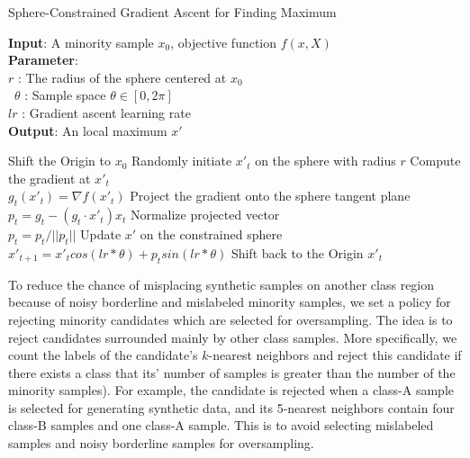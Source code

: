  
\begin{algorithm}[ht]
	\caption{Sphere-Constrained Gradient Ascent for Finding Maximum}
	
	\begin{flushleft}
		\textbf{Input}: A minority sample $x_0$, objective function $f(x,X)$\\
		\textbf{Parameter}: \\
		$r$ : The radius of the sphere centered at $x_0$  \\\
		$\theta$ : Sample space $\theta \in [0,2\pi]$ \\
		$lr$ : Gradient ascent learning rate\\
		
		\textbf{Output}: An local maximum $x'$\\
		\begin{algorithmic}[1]
			\STATE Shift the Origin to $x_0$
			\STATE Randomly initiate $x'_t$ on the sphere with radius $r$	
			\STATE Compute the gradient at $x'_t$\\
			$g_t(x'_t) = \nabla f(x'_t)$
			\STATE Project the gradient onto the sphere tangent plane\\
			$p_t = g_t - (g_t \cdot x'_t) x_t$
			\STATE Normalize projected vector\\
			$p_t = p_t/ ||p_t||$
			\STATE Update $x'$ on the constrained sphere \\
			$x'_{t+1} = x'_t cos(lr*\theta) + p_t sin (lr*\theta)$ 			
			\ENDWHILE
			\STATE Shift back to the Origin
			\RETURN $x'_t$
		\end{algorithmic}
	\end{flushleft}
	\label{alg:optimization}
\end{algorithm}


To reduce the chance of misplacing synthetic samples on another class region because of noisy borderline and mislabeled minority samples, we set a policy for rejecting minority candidates which are selected for oversampling. The idea is to reject candidates surrounded mainly by other class samples. More specifically, we count the labels of the candidate's $k$-nearest neighbors and reject this candidate if there exists a class that its' number of samples is greater than the number of the minority samples). For example, the candidate is rejected when a class-A sample is selected for generating synthetic data, and its 5-nearest neighbors contain four class-B samples and one class-A sample. This is to avoid selecting mislabeled samples and noisy borderline samples for oversampling.     
 

